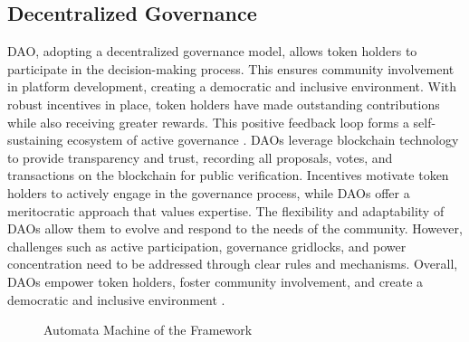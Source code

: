 \documentclass[lettersize,journal]{IEEEtran}
\begin{document}
\subsection{Decentralized Governance}

DAO, adopting a decentralized governance model, allows token holders to participate in the decision-making process. This ensures community involvement in platform development, creating a democratic and inclusive environment. With robust incentives in place, token holders have made outstanding contributions while also receiving greater rewards. This positive feedback loop forms a self-sustaining ecosystem of active governance \cite{beck2018governance}. DAOs leverage blockchain technology to provide transparency and trust, recording all proposals, votes, and transactions on the blockchain for public verification. Incentives motivate token holders to actively engage in the governance process, while DAOs offer a meritocratic approach that values expertise. The flexibility and adaptability of DAOs allow them to evolve and respond to the needs of the community. However, challenges such as active participation, governance gridlocks, and power concentration need to be addressed through clear rules and mechanisms. Overall, DAOs empower token holders, foster community involvement, and create a democratic and inclusive environment \cite{jensen2019theory}.

\begin{figure}[ht]
  \caption{Automata Machine of the Framework}
  \label{fig:decentralized_governance}
\end{figure}
\end{document}
